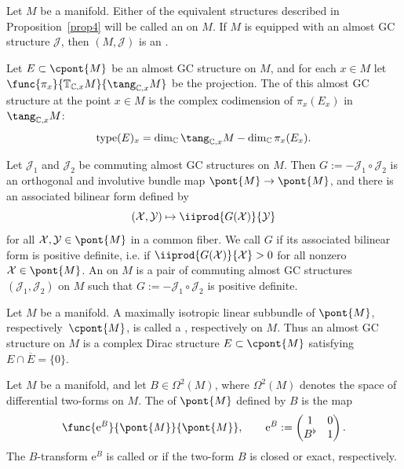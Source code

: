 \begin{Definition}
Let $M$ be a manifold.  Either of the equivalent structures described in Proposition~\ref{prop4} will be called an  on $M$.  If $M$ is equipped with an almost GC structure $\mathcal{J}$, then $(M,\mathcal{J})$ is an .

Let $E \subset \cpont{M}$ be an almost GC structure on $M$, and for each $x \in M$ let $\func{\pi_x}{\mathbb{T}_{\mathbb{C},x} M}{\tang_{\mathbb{C},x} M}$ be the projection.  The  of this almost GC structure at the point $x \in M$ is the complex codimension of $\pi_x(E_x)$ in $\tang_{\mathbb{C},x} M$:
\[
  \operatorname{type}(E)_x
  =
  \dim_{\mathbb{C}} \tang_{\mathbb{C},x} M - \dim_{\mathbb{C}} \pi_x(E_x).
\]

Let $\mathcal{J}_1$ and $\mathcal{J}_2$ be commuting almost GC structures on $M$.  Then $G := -\mathcal{J}_1 \circ \mathcal{J}_2$ is an orthogonal and involutive bundle map $\pont{M} \to \pont{M}$, and there is an associated bilinear form def\/ined by
\[
  (\mathcal{X},\mathcal{Y}) \mapsto \iiprod{G(\mathcal{X})}{\mathcal{Y}}
\]
for all $\mathcal{X}, \mathcal{Y} \in \pont{M}$ in a common f\/iber.
We call $G$  if its associated bilinear form is positive def\/inite, i.e. if $\iiprod{G(\mathcal{X})}{\mathcal{X}} > 0$ for all nonzero $\mathcal{X} \in \pont{M}$.
An   on $M$ is a pair of commuting almost GC structures $(\mathcal{J}_1,\mathcal{J}_2)$ on $M$ such that $G := -\mathcal{J}_1 \circ \mathcal{J}_2$ is positive def\/inite.
\end{Definition}


\begin{Remark}
Let $M$ be a manifold.  A maximally isotropic linear subbundle of $\pont{M}$, respectively~$\cpont{M}$, is called a , respectively  on $M$.
Thus an almost GC structure on $M$ is a complex Dirac structure $E \subset \cpont{M}$ satisfying $E \cap \overline{E} = \{0\}$.
\end{Remark}


\begin{Definition}
Let $M$ be a manifold, and let $B \in \Omega^2(M)$, where $\Omega^2(M)$ denotes the space of dif\/ferential two-forms on $M$.  The  of $\pont{M}$ def\/ined by $B$ is the map
\[
  \func{\mathrm{e}^{B}}{\pont{M}}{\pont{M}},
  \qquad
  \mathrm{e}^B := \begin{pmatrix} 1 & 0 \\ B^{\flat} & 1 \end{pmatrix}.
\]
The $B$-transform $\mathrm{e}^B$ is called  or  if the two-form $B$ is closed or exact, respectively.
\end{Definition}


